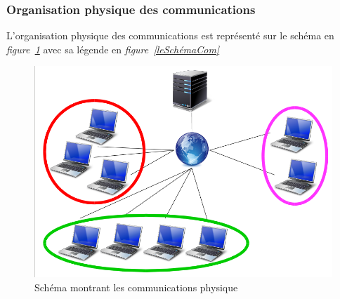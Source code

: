 \documentclass[a4paper,11pt]{report}
\begin{document}
\subsubsection{Organisation physique des communications}

L’organisation physique des communications est représenté sur le schéma en \textit{figure~\ref{schémaCom}} avec sa légende en \textit{figure~\ref{leSchémaCom}}
  
  \begin{figure}[th]
      \begin{center}
        \includegraphics[scale=0.4]{Assets/s_r_1.png}
        \caption{Schéma montrant les communications physique}
        \label{schémaCom}
      \end{center}
    \end{figure}
\end{document}
